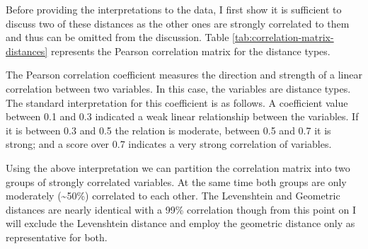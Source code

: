     Before providing the interpretations to the data, I first show it is sufficient to discuss two of these distances as the other ones are strongly correlated to them and thus can be omitted from the discussion. Table \ref{tab:correlation-matrix-distances} represents the Pearson correlation matrix for the distance types. 
    
    \begin{table}[!ht]
    \centering
    \caption{Pearson correlation coefficients for pairs of distance measure types}
    \label{tab:correlation-matrix-distances}
    \end{table}
    
    The Pearson correlation coefficient measures the direction and strength of a linear correlation between two variables. In this case, the variables are distance types. The standard interpretation for this coefficient is as follows. A coefficient value between 0.1 and 0.3 indicated a weak linear relationship between the variables. If it is between 0.3 and 0.5 the relation is moderate, between 0.5 and 0.7 it is strong; and a score over 0.7 indicates a very strong correlation of variables. 
    
    Using the above interpretation we can partition the correlation matrix into two groups of strongly correlated variables. At the same time both groups are only moderately (\textasciitilde50\%) correlated to each other. The Levenshtein and Geometric distances are nearly identical with a 99\% correlation though from this point on I will exclude the Levenshtein distance and employ the geometric distance only as representative for both. 
    
